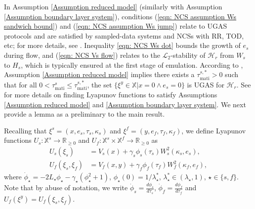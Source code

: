 \vspace{-0.5cm}
In Assumption \ref{Assumption reduced model} (similarly with Assumption \ref{Assumption boundary layer system}), conditions (\ref{eqn: NCS assumption Ws sandwich bound}) and (\ref{eqn: NCS assumption Ws jump}) relate to UGAS protocols and are satisfied by sampled-data systems and NCSs with RR, TOD, etc; for more details, see \cite{dragan_stability}. Inequality \eqref{eqn: NCS Ws dot} bounds the growth of $e_s$ during flow, and (\ref{eqn: NCS Vs flow}) relates to the $\mathcal{L}_2$-stability of $\mathcal{H}_r$ from $W_s$ to $H_s$, which is typically ensured at the first stage of emulation.
%
According to \cite{carnevale_stability}, Assumption \ref{Assumption reduced model} implies there exists a $\tau_{\text{mati}}^{s,*} > 0$ such that for all $0<\tau_{\text{mati}}^{s}\leq \tau_{\text{mati}}^{s,*}$, the set $\{\xi^y \in \mathbb{X} | x = 0 \wedge e_s = 0 \}$ is UGAS for $\mathcal{H}_r$.
%
See \cite{dragan_stability} for more details on finding Lyapunov functions to satisfy Assumptions \ref{Assumption reduced model} and \ref{Assumption boundary layer system}. 
We next provide a lemma as a preliminary to the main result. %
%

Recalling that $\xi^s = (x, e_s, \tau_s, \kappa_s)$ and $\xi^f = (y, e_f, \tau_f, \kappa_f)$, we define Lyapunov functions ${U_s}:  \mathbb{X}^{s} \to \mathbb{R}_{\geq 0}$ and $U_f :\mathbb{X}^{s} \times\mathbb{X}^{f} \to \mathbb{R}_{\geq 0}$ as \cite[Eqn. (25)]{carnevale_stability} 
\begin{subequations}
    \begin{align}
        U_s(\xi_s) &= V_s(x) + \gamma_s \phi_s(\tau_s) W_s^2(\kappa_s, e_s), \label{eqn: definition of U_s}\\
        U_f(\xi_s,\xi_f) &=  V_f(x,y) + \gamma_f \phi_f(\tau_f) W_f^2(\kappa_f, e_f), \label{eqn: definition of U_f}%
    \end{align}
    \label{eqn: Us and Uf}%
\end{subequations}
where $\dot \phi_\star = -2L_\star \phi_\star - \gamma_\star (\phi_\star^2 + 1)$, $\phi_\star(0) = 1/\lambda_\star^*$, $\lambda_\star^* \in (\lambda_\star, 1)$, $\star \in \{s,f\}$. Note that by abuse of notation, we write $\dot{\phi}_s = \tfrac{d \phi_s}{d \tau_s}$, $\dot{\phi}_f = \tfrac{d \phi_f}{d \tau_f}$ and $U_f(\xi^y) = U_f(\xi_s, \xi_f)$.
%
 
